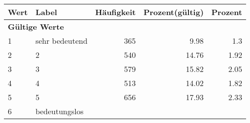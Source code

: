      \begin{longtable}{lXrrr}
     \toprule
     \textbf{Wert} & \textbf{Label} & \textbf{Häufigkeit} & \textbf{Prozent(gültig)} & \textbf{Prozent} \\
     \endhead
     \midrule
     \multicolumn{5}{l}{\textbf{Gültige Werte}}\\

     1 &
     \multicolumn{1}{X}{ sehr bedeutend   } &


       \num{365} &
       \num[round-mode=places,round-precision=2]{9,98} &
         \num[round-mode=places,round-precision=2]{1,3} \\

     2 &
     \multicolumn{1}{X}{ 2   } &


       \num{540} &
       \num[round-mode=places,round-precision=2]{14,76} &
         \num[round-mode=places,round-precision=2]{1,92} \\

     3 &
     \multicolumn{1}{X}{ 3   } &


       \num{579} &
       \num[round-mode=places,round-precision=2]{15,82} &
         \num[round-mode=places,round-precision=2]{2,05} \\

     4 &
     \multicolumn{1}{X}{ 4   } &


       \num{513} &
       \num[round-mode=places,round-precision=2]{14,02} &
         \num[round-mode=places,round-precision=2]{1,82} \\

     5 &
     \multicolumn{1}{X}{ 5   } &


       \num{656} &
       \num[round-mode=places,round-precision=2]{17,93} &
         \num[round-mode=places,round-precision=2]{2,33} \\

     6 &
     \multicolumn{1}{X}{ bedeutungslos   } &



\end{longtable}

